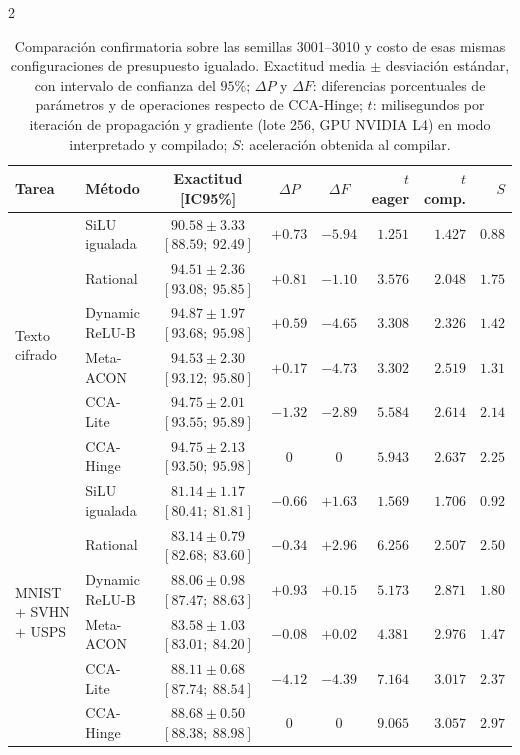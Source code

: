 \begin{multicols}{2}
\begin{table}[t]
\centering
\caption{Comparación confirmatoria sobre las semillas 3001--3010 y costo de esas mismas configuraciones de presupuesto igualado. Exactitud media $\pm$ desviación estándar, con intervalo de confianza del $95\%$; $\Delta P$ y $\Delta F$: diferencias porcentuales de parámetros y de operaciones respecto de CCA-Hinge; $t$: milisegundos por iteración de propagación y gradiente (lote 256, GPU NVIDIA L4) en modo interpretado y compilado; $S$: aceleración obtenida al compilar.}
\label{tab:matched}
\footnotesize
\setlength{\tabcolsep}{2.6pt}
\begin{tabular}{@{}llcccrrr@{}}
\toprule
\textbf{Tarea} & \textbf{Método} & \textbf{Exactitud [IC95\%]} & $\Delta P$ & $\Delta F$ & $t$ \textbf{eager} & $t$ \textbf{comp.} & $S$\\
\midrule
\multirow{6}{*}{Texto cifrado}
& SiLU igualada & $90.58{\pm}3.33$ $[88.59;\ 92.49]$ & $+0.73$ & $-5.94$ & $1.251$ & $1.427$ & $0.88$\\
& Rational & $94.51{\pm}2.36$ $[93.08;\ 95.85]$ & $+0.81$ & $-1.10$ & $3.576$ & $2.048$ & $1.75$\\
& Dynamic ReLU-B & $\mathbf{94.87{\pm}1.97}$ $[93.68;\ 95.98]$ & $+0.59$ & $-4.65$ & $3.308$ & $2.326$ & $1.42$\\
& Meta-ACON & $94.53{\pm}2.30$ $[93.12;\ 95.80]$ & $+0.17$ & $-4.73$ & $3.302$ & $2.519$ & $1.31$\\
& CCA-Lite & $94.75{\pm}2.01$ $[93.55;\ 95.89]$ & $-1.32$ & $-2.89$ & $5.584$ & $2.614$ & $2.14$\\
& CCA-Hinge & $94.75{\pm}2.13$ $[93.50;\ 95.98]$ & $0$ & $0$ & $5.943$ & $2.637$ & $\mathbf{2.25}$\\
\midrule
\multirow{6}{*}{MNIST + SVHN + USPS}
& SiLU igualada & $81.14{\pm}1.17$ $[80.41;\ 81.81]$ & $-0.66$ & $+1.63$ & $1.569$ & $1.706$ & $0.92$\\
& Rational & $83.14{\pm}0.79$ $[82.68;\ 83.60]$ & $-0.34$ & $+2.96$ & $6.256$ & $2.507$ & $2.50$\\
& Dynamic ReLU-B & $88.06{\pm}0.98$ $[87.47;\ 88.63]$ & $+0.93$ & $+0.15$ & $5.173$ & $2.871$ & $1.80$\\
& Meta-ACON & $83.58{\pm}1.03$ $[83.01;\ 84.20]$ & $-0.08$ & $+0.02$ & $4.381$ & $2.976$ & $1.47$\\
& CCA-Lite & $88.11{\pm}0.68$ $[87.74;\ 88.54]$ & $-4.12$ & $-4.39$ & $7.164$ & $3.017$ & $2.37$\\
& CCA-Hinge & $\mathbf{88.68{\pm}0.50}$ $[88.38;\ 88.98]$ & $0$ & $0$ & $9.065$ & $3.057$ & $\mathbf{2.97}$\\
\bottomrule
\end{tabular}
\end{table}


\end{multicols}
